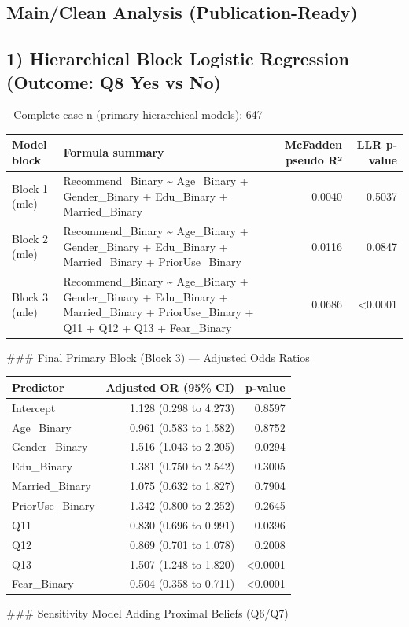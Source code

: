 \documentclass[12pt,a4paper]{article}
\begin{document}
\subsection*{Main/Clean Analysis (Publication-Ready)}
\subsection*{1) Hierarchical Block Logistic Regression (Outcome: Q8 Yes vs No)}
- Complete-case n (primary hierarchical models): 647

\begin{center}
\small
\begin{tabular}{llrr}
\hline
\textbf{Model block} & \textbf{Formula summary} & \textbf{McFadden pseudo R²} & \textbf{LLR p-value} \\
\hline
Block 1 (mle) & Recommend\_Binary \textasciitilde{} Age\_Binary + Gender\_Binary + Edu\_Binary + Married\_Binary & 0.0040 & 0.5037 \\
Block 2 (mle) & Recommend\_Binary \textasciitilde{} Age\_Binary + Gender\_Binary + Edu\_Binary + Married\_Binary + PriorUse\_Binary & 0.0116 & 0.0847 \\
Block 3 (mle) & Recommend\_Binary \textasciitilde{} Age\_Binary + Gender\_Binary + Edu\_Binary + Married\_Binary + PriorUse\_Binary + Q11 + Q12 + Q13 + Fear\_Binary & 0.0686 & <0.0001 \\
\hline
\end{tabular}
\end{center}
\#\#\# Final Primary Block (Block 3) — Adjusted Odds Ratios

\begin{center}
\small
\begin{tabular}{lrr}
\hline
\textbf{Predictor} & \textbf{Adjusted OR (95\% CI)} & \textbf{p-value} \\
\hline
Intercept & 1.128 (0.298 to 4.273) & 0.8597 \\
Age\_Binary & 0.961 (0.583 to 1.582) & 0.8752 \\
Gender\_Binary & 1.516 (1.043 to 2.205) & 0.0294 \\
Edu\_Binary & 1.381 (0.750 to 2.542) & 0.3005 \\
Married\_Binary & 1.075 (0.632 to 1.827) & 0.7904 \\
PriorUse\_Binary & 1.342 (0.800 to 2.252) & 0.2645 \\
Q11 & 0.830 (0.696 to 0.991) & 0.0396 \\
Q12 & 0.869 (0.701 to 1.078) & 0.2008 \\
Q13 & 1.507 (1.248 to 1.820) & <0.0001 \\
Fear\_Binary & 0.504 (0.358 to 0.711) & <0.0001 \\
\hline
\end{tabular}
\end{center}
\#\#\# Sensitivity Model Adding Proximal Beliefs (Q6/Q7)
\end{document}
